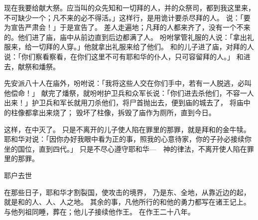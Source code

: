 {现在我要给{}献大祭。应当叫{}的众先知和一切拜{}的人，并{}的众祭司，都到我这里来，不可缺少一个；凡不来的必不得活。」{}这样行，是用诡计要杀尽拜{}的人。
说：「要为{}宣告严肃会！」于是宣告了。
差人走遍{}地；凡拜{}的人都来齐了，没有一个不来的。他们进了{}庙，{}庙中从前边直到后边都满了人。
吩咐掌管礼服的人说：「拿出礼服来，给一切拜{}的人穿。」他就拿出礼服来给了他们。
和{}的儿子{}进了{}庙，对拜{}的人说：「你们察看察看，在你们这里不可有耶和华的仆人，只可容留拜{}的人。」
和{}进去，献{}祭和燔祭。
\par }{先安派八十人在庙外，吩咐说：「我将这些人交在你们手中，若有一人脱逃，{}必叫他偿命！」
献完了燔祭，就{}吩咐护卫兵和众军长说：「你们进去杀他们，不容一人出来！」护卫兵和军长就用刀杀他们，将尸首抛出去，便到{}庙的城去了，
将{}庙中的柱像都拿出来烧了；
毁坏了{}柱像，拆毁了{}庙作为厕所，直到今日。
\par }{\PP {}这样，{}在{}中灭了{}。
只是{}不离开{}的儿子{}使{}人陷在罪里的那罪，就是拜{}和{}的金牛犊。
耶和华对{}说：「因你办好我眼中看为正的事，照我的心意待{}家，你的子孙必接续你坐{}的国位，直到四代。」
只是{}不尽心遵守耶和华—{}　神的律法，不离开{}使{}人陷在罪里的那罪。
\par }{\SH 耶户去世
\par }{\PP {}在那些日子，耶和华才割裂{}国，使{}攻击{}的境界，
乃是{}东、{}全地，从靠近{}边的{}起，就是{}和{}的{}人、{}人、{}人之地。
其余的事，凡他所行的和他的勇力都写在{}诸王记上。
与他列祖同睡，葬在{}；他儿子{}接续他作王。
在{}作{}王二十八年。

}
